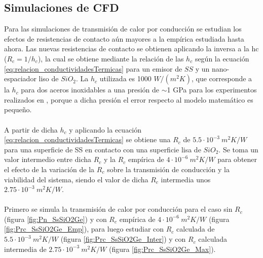 \subsection{Simulaciones de CFD}
Para las simulaciones de transmisión de calor por conducción se estudian los efectos de resistencias de contacto aún mayores a la empírica estudiada hasta ahora. Las nuevas resistencias de contacto se obtienen aplicando la inversa a la \gls{hc} ($R_c=1/h_c$), la cual se obtiene mediante la relación de las $h_c$ según la ecuación \eqref{eq:relacion_conductividadesTermicas} para un emisor de $SS$ y un nano-espaciador liso de $SiO_2$. La $h_c$ utilizada es 1000 $W/(m^2 K)$, que corresponde a la $h_c$ para dos aceros inoxidables a una presión de $\sim$1 GPa para los experimentos realizados en \cite{experimental_Rc_SS}, porque a dicha presión el error respecto al modelo matemático es pequeño.\\\\
A partir de dicha $h_c$ y aplicando la ecuación \eqref{eq:relacion_conductividadesTermicas} se obtiene una $R_c$ de $5.5\cdot 10^{-3} \ m^2 K/W$ para una superficie de SS en contacto con una superficie lisa de $SiO_2$. Se toma un valor intermedio entre dicha $R_c$ y la $R_c$ empírica de $4\cdot 10^{-6} \ m^2 K/W$ \cite{nf_TPV_Pillars_SiO2} para obtener el efecto de la variación de la $R_c$ sobre la transmisión de conducción y la viabilidad del sistema, siendo el valor de dicha $R_c$ intermedia unos $2.75\cdot 10^{-3} \ m^2 K/W$.\\\\
Primero se simula la transmisión de calor por conducción para el caso sin $R_c$ (figura \ref{fig:Pn_SsSiO2Ge}) y con $R_c$ empírica de $4\cdot 10^{-6} \ m^2 K/W$ (figura \ref{fig:Prc_SsSiO2Ge_Emp}), para luego estudiar con $R_c$ calculada de $5.5\cdot 10^{-3} \ m^2 K/W$ (figura \ref{fig:Prc_SsSiO2Ge_Inter}) y con $R_c$ calculada intermedia de $2.75\cdot 10^{-3} \ m^2 K/W$ (figura \ref{fig:Prc_SsSiO2Ge_Max}).
\graphicspath{ {./figuras/Resultados/conduccion/pdf/} }
